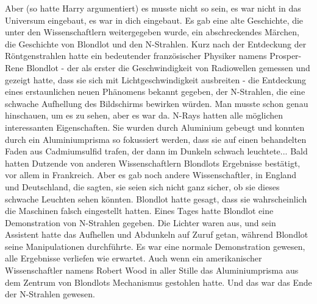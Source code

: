 Aber (so hatte Harry argumentiert) es musste nicht so sein, es war nicht in das
Universum eingebaut, es war in dich eingebaut. Es gab eine alte Geschichte, die
unter den Wissenschaftlern weitergegeben wurde, ein abschreckendes Märchen, die
Geschichte von Blondlot und den N-Strahlen. Kurz nach der Entdeckung der
Röntgenstrahlen hatte ein bedeutender französischer Physiker namens Prosper-Rene
Blondlot - der als erster die Geschwindigkeit von Radiowellen gemessen und
gezeigt hatte, dass sie sich mit Lichtgeschwindigkeit ausbreiten - die
Entdeckung eines erstaunlichen neuen Phänomens bekannt gegeben, der N-Strahlen,
die eine schwache Aufhellung des Bildschirms bewirken würden. Man musste schon
genau hinschauen, um es zu sehen, aber es war da. N-Rays hatten alle möglichen
interessanten Eigenschaften. Sie wurden durch Aluminium gebeugt und konnten
durch ein Aluminiumprisma so fokussiert werden, dass sie auf einen behandelten
Faden aus Cadmiumsulfid trafen, der dann im Dunkeln schwach leuchtete... Bald
hatten Dutzende von anderen Wissenschaftlern Blondlots Ergebnisse bestätigt, vor
allem in Frankreich. Aber es gab noch andere Wissenschaftler, in England und
Deutschland, die sagten, sie seien sich nicht ganz sicher, ob sie dieses
schwache Leuchten sehen könnten. Blondlot hatte gesagt, dass sie wahrscheinlich
die Maschinen falsch eingestellt hatten. Eines Tages hatte Blondlot eine
Demonstration von N-Strahlen gegeben. Die Lichter waren aus, und sein Assistent
hatte das Aufhellen und Abdunkeln auf Zuruf getan, während Blondlot seine
Manipulationen durchführte. Es war eine normale Demonstration gewesen, alle
Ergebnisse verliefen wie erwartet. Auch wenn ein amerikanischer Wissenschaftler
namens Robert Wood in aller Stille das Aluminiumprisma aus dem Zentrum von
Blondlots Mechanismus gestohlen hatte. Und das war das Ende der N-Strahlen
gewesen.

